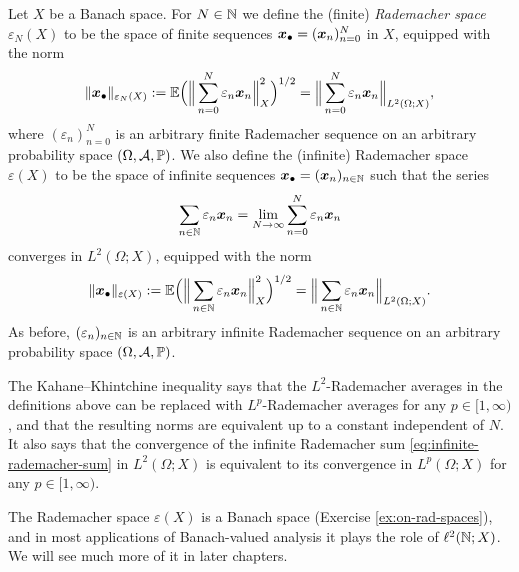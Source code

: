 \begin{defn}
  Let $X$ be a Banach space.
  For $N \in \mathbb{N}$ we define the (finite) \emph{Rademacher space} $\varepsilon_{N}(X)$ to be the space of finite sequences $\bm{x}_{\bullet} = (\bm{x}_{n})_{n=0}^{N}$ in $X$, equipped with the norm
  \begin{equation*}
    \|\bm{x}_{\bullet}\|_{\varepsilon_{N}(X)} := \mathbb{E} \Big( \Big\| \sum_{n=0}^{N} \varepsilon_{n} \bm{x}_{n} \Big\|_{X}^{2} \Big)^{1/2} = \Big\| \sum_{n=0}^{N} \varepsilon_{n} \bm{x}_{n} \Big\|_{L^{2}(\Omega;X)},
  \end{equation*}
  where $(\varepsilon_{n})_{n = 0}^{N}$ is an arbitrary finite Rademacher sequence on an arbitrary probability space $(\Omega,\mathcal{A},\mathbb{P})$.
  We also define the (infinite) Rademacher space $\varepsilon(X)$ to be the space of infinite sequences $\bm{x}_{\bullet} = (\bm{x}_{n})_{n \in \mathbb{N}}$ such that the series
  \begin{equation}\label{eq:infinite-rademacher-sum}
    \sum_{n \in \mathbb{N}} \varepsilon_{n} \bm{x}_{n} = \lim_{N \to \infty} \sum_{n = 0}^{N} \varepsilon_{n} \bm{x}_{n}
  \end{equation}
  converges in $L^{2}(\Omega;X)$, equipped with the norm
  \begin{equation*}
    \|\bm{x}_{\bullet}\|_{\varepsilon(X)} := \mathbb{E} \Big( \Big\| \sum_{n \in \mathbb{N}} \varepsilon_{n} \bm{x}_{n} \Big\|_{X}^{2} \Big)^{1/2} = \Big\| \sum_{n \in \mathbb{N}} \varepsilon_{n} \bm{x}_{n} \Big\|_{L^{2}(\Omega;X)}.
  \end{equation*}
  As before, $(\varepsilon_{n})_{n \in \mathbb{N}}$ is an arbitrary infinite Rademacher sequence on an arbitrary probability space $(\Omega,\mathcal{A},\mathbb{P})$.
\end{defn}

\begin{rmk}
  The Kahane--Khintchine inequality says that the $L^2$-Rademacher averages in the definitions above can be replaced with $L^p$-Rademacher averages for any $p \in [1,\infty)$, and that the resulting norms are equivalent up to a constant independent of $N$.
  It also says that the convergence of the infinite Rademacher sum \eqref{eq:infinite-rademacher-sum} in $L^2(\Omega;X)$ is equivalent to its convergence in $L^p(\Omega;X)$ for any $p \in [1,\infty)$.
\end{rmk}

The Rademacher space $\varepsilon(X)$ is a Banach space (Exercise \ref{ex:on-rad-spaces}), and in most applications of Banach-valued analysis it plays the role of $\ell^2(\mathbb{N};X)$.
We will see much more of it in later chapters.

